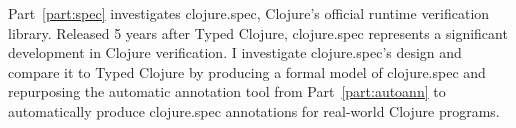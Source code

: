 Part~\ref{part:spec} investigates clojure.spec, Clojure's official runtime verification library.
Released 5 years after Typed Clojure, clojure.spec represents a significant development in Clojure
verification. I investigate clojure.spec's design and compare it to Typed Clojure
by producing a formal model of clojure.spec and repurposing the automatic annotation tool 
from Part~\ref{part:autoann} to automatically produce clojure.spec annotations for real-world Clojure programs.
%


%
